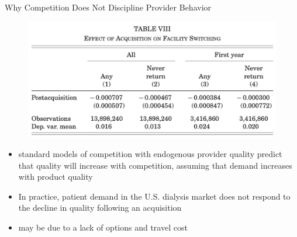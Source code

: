 \begin{frame}{Why Competition Does Not Discipline Provider Behavior}
    \begin{figure}
        \centering
        \includegraphics[width=0.7\linewidth]{tb8.png}
    \end{figure}
    \begin{itemize}
        \item standard models of competition with endogenous provider quality predict that quality will increase with competition, assuming that demand increases with product quality
        \item In practice, patient demand in the U.S. dialysis market does not respond to the decline in quality following an acquisition
        \item may be due to a lack of options and travel cost
    \end{itemize}
\end{frame}